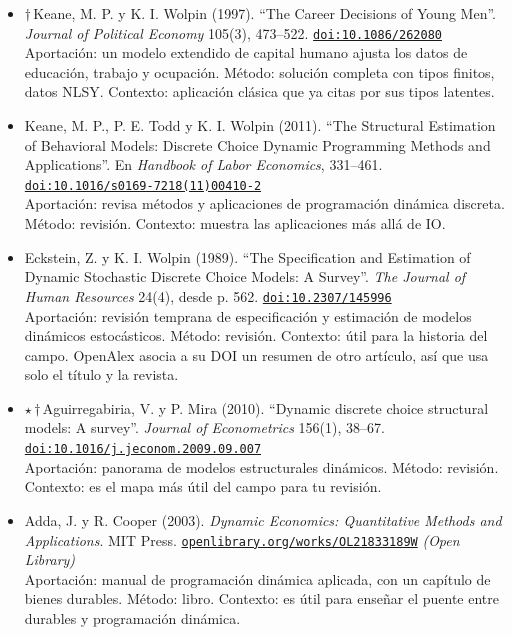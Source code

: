 \documentclass[11pt]{article}
\begin{document}
\begin{itemize}
Aportación: estima el valor de las patentes a partir de sus renovaciones. Método: paro óptimo con incertidumbre, estimado por simulación. Contexto: es un caso de pagar por mantener vivo un activo, parecido en estructura a reparar.
\item $\dagger$\,Keane, M. P. y K. I. Wolpin (1997). ``The Career Decisions of Young Men''. \textit{Journal of Political Economy} 105(3), 473--522. \href{https://doi.org/10.1086/262080}{\texttt{doi:10.1086/262080}}\\
Aportación: un modelo extendido de capital humano ajusta los datos de educación, trabajo y ocupación. Método: solución completa con tipos finitos, datos NLSY. Contexto: aplicación clásica que ya citas por sus tipos latentes.
\item Keane, M. P., P. E. Todd y K. I. Wolpin (2011). ``The Structural Estimation of Behavioral Models: Discrete Choice Dynamic Programming Methods and Applications''. En \textit{Handbook of Labor Economics}, 331--461. \href{https://doi.org/10.1016/s0169-7218(11)00410-2}{\texttt{doi:10.1016/s0169-7218(11)00410-2}}\\
Aportación: revisa métodos y aplicaciones de programación dinámica discreta. Método: revisión. Contexto: muestra las aplicaciones más allá de IO.
\item Eckstein, Z. y K. I. Wolpin (1989). ``The Specification and Estimation of Dynamic Stochastic Discrete Choice Models: A Survey''. \textit{The Journal of Human Resources} 24(4), desde p. 562. \href{https://doi.org/10.2307/145996}{\texttt{doi:10.2307/145996}}\\
Aportación: revisión temprana de especificación y estimación de modelos dinámicos estocásticos. Método: revisión. Contexto: útil para la historia del campo. OpenAlex asocia a su DOI un resumen de otro artículo, así que usa solo el título y la revista.
\item $\star$\,$\dagger$\,Aguirregabiria, V. y P. Mira (2010). ``Dynamic discrete choice structural models: A survey''. \textit{Journal of Econometrics} 156(1), 38--67. \href{https://doi.org/10.1016/j.jeconom.2009.09.007}{\texttt{doi:10.1016/j.jeconom.2009.09.007}}\\
Aportación: panorama de modelos estructurales dinámicos. Método: revisión. Contexto: es el mapa más útil del campo para tu revisión.
\item Adda, J. y R. Cooper (2003). \textit{Dynamic Economics: Quantitative Methods and Applications}. MIT Press. \href{https://openlibrary.org/works/OL21833189W}{\texttt{openlibrary.org/works/OL21833189W}} \textit{(Open Library)}\\
Aportación: manual de programación dinámica aplicada, con un capítulo de bienes durables. Método: libro. Contexto: es útil para enseñar el puente entre durables y programación dinámica.
\end{itemize}
\end{document}
